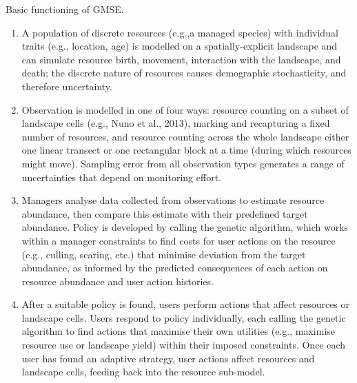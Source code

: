 \documentclass[12pt]{article}
\begin{document}
Basic functioning of GMSE.
\begin{enumerate}
                \item A population of discrete resources (e.g.,a managed species) with individual traits (e.g., location, age) is modelled on a spatially-explicit landscape and can simulate resource birth, movement, interaction with the landscape, and death; the discrete nature of resources causes demographic stochasticity, and therefore uncertainty. %
                \item Observation is modelled in one of four ways: resource counting on a subset of landscape cells (e.g., Nuno et al., 2013), marking and recapturing a fixed number of resources, and resource counting across the whole landscape either one linear transect or one rectangular block at a time (during which resources might move). Sampling error from all observation types generates a range of uncertainties that depend on monitoring effort.
                \item Managers analyse data collected from observations to estimate resource abundance, then compare this estimate with their predefined target abundance. Policy is developed by calling the genetic algorithm, which works within a manager constraints to find costs for user actions on the resource (e.g., culling, scaring, etc.) that minimise deviation from the target abundance, as informed by the predicted consequences of each action on resource abundance and user action histories.
                \item After a suitable policy is found, users perform actions that affect resources or landscape cells. Users respond to policy individually, each calling the genetic algorithm to find actions that maximise their own utilities (e.g., maximise resource use or landscape yield) within their imposed constraints. Once each user has found an adaptive strategy, user actions affect resources and landscape cells, feeding back into the resource sub-model.
\end{enumerate}
\end{document}
